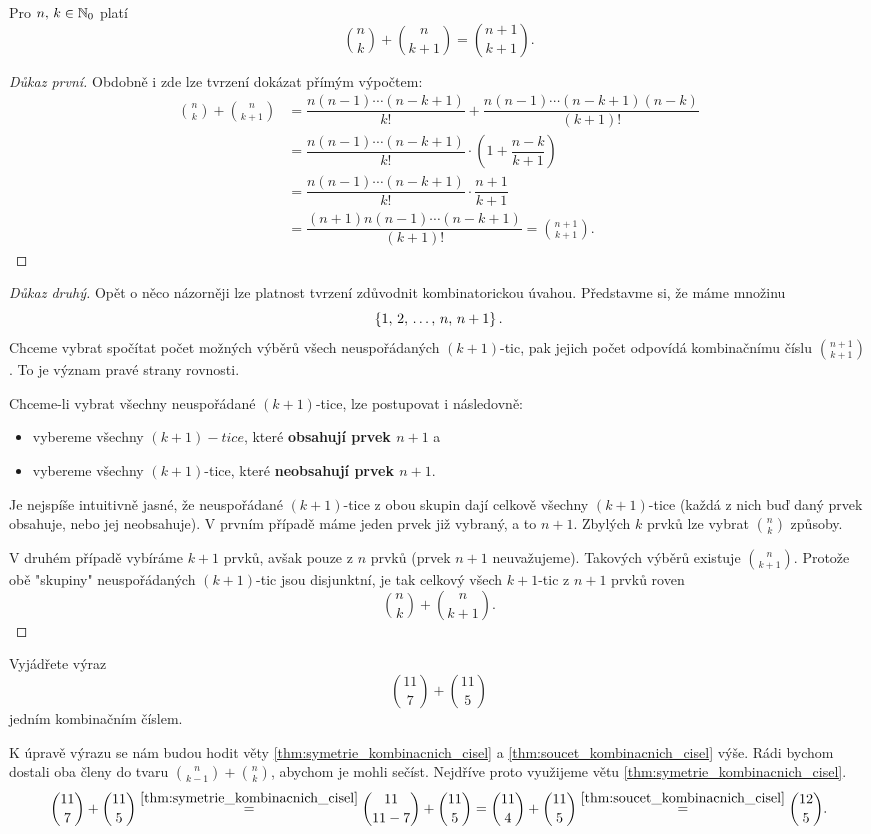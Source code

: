 \begin{theorem}\label{thm:soucet_kombinacnich_cisel}
    Pro $n,\,k\in\mathbb{N}_0$ platí
    \[\binom{n}{k}+\binom{n}{k+1}=\binom{n+1}{k+1}.\]
\end{theorem}
\begin{proof}[Důkaz první]
    Obdobně i zde lze tvrzení dokázat přímým výpočtem:
    \begin{align*}
        \binom{n}{k}+\binom{n}{k+1}&=\dfrac{n(n-1)\cdots(n-k+1)}{k!}+\dfrac{n(n-1)\cdots(n-k+1)(n-k)}{(k+1)!}\\ &=\dfrac{n(n-1)\cdots(n-k+1)}{k!}\cdot\left(1+\dfrac{n-k}{k+1}\right)\\ &=\dfrac{n(n-1)\cdots(n-k+1)}{k!}\cdot\dfrac{n+1}{k+1}\\ &=\dfrac{(n+1)n(n-1)\cdots(n-k+1)}{(k+1)!}=\binom{n+1}{k+1}.
    \end{align*}
\end{proof}
\begin{proof}[Důkaz druhý]
    Opět o něco názorněji lze platnost tvrzení zdůvodnit kombinatorickou úvahou. Představme si, že máme množinu
    \[\left\{1,\,2,\,\dots,\,n,\,n+1\right\}.\]
    Chceme vybrat spočítat počet možných výběrů všech neuspořádaných $(k+1)$-tic, pak jejich počet odpovídá kombinačnímu číslu $\binom{n+1}{k+1}$. To je význam pravé strany rovnosti.\par
    Chceme-li vybrat všechny neuspořádané $(k+1)$-tice, lze postupovat i následovně:
    \begin{itemize}
        \item vybereme všechny $(k+1)-tice$, které \textbf{obsahují prvek $n+1$} a
        \item vybereme všechny $(k+1)$-tice, které \textbf{neobsahují prvek $n+1$}.
    \end{itemize}
    Je nejspíše intuitivně jasné, že neuspořádané $(k+1)$-tice z obou skupin dají celkově všechny $(k+1)$-tice (každá z nich buď daný prvek obsahuje, nebo jej neobsahuje). V prvním případě máme jeden prvek již vybraný, a to $n+1$. Zbylých $k$ prvků lze vybrat $\binom{n}{k}$ způsoby.\par
    V druhém případě vybíráme $k+1$ prvků, avšak pouze z $n$ prvků (prvek $n+1$ neuvažujeme). Takových výběrů existuje $\binom{n}{k+1}$. Protože obě "skupiny" neuspořádaných $(k+1)$-tic jsou disjunktní, je tak celkový všech $k+1$-tic z $n+1$ prvků roven
    \[\binom{n}{k}+\binom{n}{k+1}.\]
\end{proof}
\begin{task}
    Vyjádřete výraz
    \[\binom{11}{7}+\binom{11}{5}\]
    jedním kombinačním číslem.
\end{task}
\begin{solution}
    K úpravě výrazu se nám budou hodit věty \ref{thm:symetrie_kombinacnich_cisel} a \ref{thm:soucet_kombinacnich_cisel} výše. Rádi bychom dostali oba členy do tvaru $\binom{n}{k-1}+\binom{n}{k}$, abychom je mohli sečíst. Nejdříve proto využijeme větu \ref{thm:symetrie_kombinacnich_cisel}.
    \[\binom{11}{7}+\binom{11}{5}\stackrel{\ref{thm:symetrie_kombinacnich_cisel}}{=}\binom{11}{11-7}+\binom{11}{5}=\binom{11}{4}+\binom{11}{5}\stackrel{\ref{thm:soucet_kombinacnich_cisel}}{=}\binom{12}{5}.\]
\end{solution}